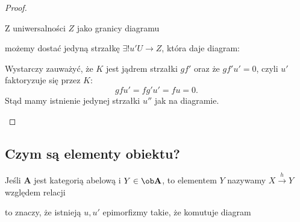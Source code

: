 \begin{proof}
\begin{itemize}
      Z uniwersalności $Z$ jako granicy diagramu  możemy dostać jedyną strzałkę $\exists! u'U\to Z$, która daje diagram:

      \begin{center}\end{center}

  Wystarczy zauważyć, że $K$ jest jądrem strzałki $gf'$ oraz że $gf'u'=0$, czyli $u'$ faktoryzuje się przez $K$:
  $$gfu'=fg'u'=fu=0.$$
  Stąd mamy istnienie jedynej strzałki $u''$ jak na diagramie.

  \end{itemize}
\end{proof}

\subsection{Czym są elementy obiektu?}

\begin{definition}
  Jeśli $\mathbf{A}$ jest kategorią abelową i $Y\in\ob \mathbf{A}$, to elementem $Y$ nazywamy  $X\xrightarrow{h}Y$ względem relacji
  \begin{center}\end{center}
  to znaczy, że istnieją $u, u'$ epimorfizmy takie, że komutuje diagram
  \begin{center}\end{center}
\end{definition}


